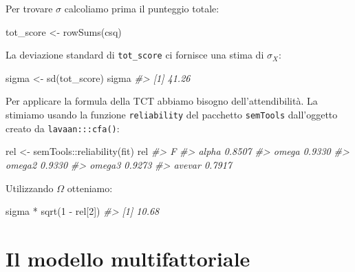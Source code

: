 \documentclass[
  11pt,
]{krantz}
\makeatletter
\newenvironment{Shaded}{\begin{snugshade}}{\end{snugshade}}
\newcommand{\CommentTok}[1]{\textcolor[rgb]{0.37,0.37,0.37}{\textit{#1}}}
\newcommand{\DecValTok}[1]{\textcolor[rgb]{0.06,0.06,0.06}{#1}}
\newcommand{\FunctionTok}[1]{\textcolor[rgb]{0,0,0}{#1}}
\newcommand{\NormalTok}[1]{#1}
\newcommand{\OtherTok}[1]{\textcolor[rgb]{0.37,0.37,0.37}{#1}}
\newcommand{\SpecialCharTok}[1]{\textcolor[rgb]{0,0,0}{#1}}
\newenvironment{kframe}{%
\medskip{}
\setlength{\fboxsep}{.8em}
 \def\at@end@of@kframe{}%
 \ifinner\ifhmode%
  \def\at@end@of@kframe{\end{minipage}}%
  \begin{minipage}{\columnwidth}%
 \fi\fi%
 \def\FrameCommand##1{\hskip\@totalleftmargin \hskip-\fboxsep
 \colorbox{shadecolor}{##1}\hskip-\fboxsep
     \hskip-\linewidth \hskip-\@totalleftmargin \hskip\columnwidth}%
 \MakeFramed {\advance\hsize-\width
   \@totalleftmargin\z@ \linewidth\hsize
   \@setminipage}}%
 {\par\unskip\endMakeFramed%
 \at@end@of@kframe}
\renewenvironment{Shaded}{\begin{kframe}}{\end{kframe}}
\theoremstyle{definition}
\theoremstyle{definition}
\theoremstyle{definition}
\theoremstyle{definition}
\theoremstyle{remark}
\makeatother
\begin{document}
Per trovare \(\sigma\) calcoliamo prima il punteggio totale:

\begin{Shaded}
\begin{Highlighting}[]
\NormalTok{tot\_score }\OtherTok{\textless{}{-}} \FunctionTok{rowSums}\NormalTok{(csq)}
\end{Highlighting}
\end{Shaded}

La deviazione standard di \texttt{tot\_score} ci fornisce una stima di \(\sigma_X\):

\begin{Shaded}
\begin{Highlighting}[]
\NormalTok{sigma }\OtherTok{\textless{}{-}} \FunctionTok{sd}\NormalTok{(tot\_score)}
\NormalTok{sigma}
\CommentTok{\#\textgreater{} [1] 41.26}
\end{Highlighting}
\end{Shaded}

Per applicare la formula della TCT abbiamo bisogno dell'attendibilità. La stimiamo usando la funzione \texttt{reliability} del pacchetto \texttt{semTools} dall'oggetto creato da \texttt{lavaan:::cfa()}:

\begin{Shaded}
\begin{Highlighting}[]
\NormalTok{rel }\OtherTok{\textless{}{-}}\NormalTok{ semTools}\SpecialCharTok{::}\FunctionTok{reliability}\NormalTok{(fit)}
\NormalTok{rel}
\CommentTok{\#\textgreater{}             F}
\CommentTok{\#\textgreater{} alpha  0.8507}
\CommentTok{\#\textgreater{} omega  0.9330}
\CommentTok{\#\textgreater{} omega2 0.9330}
\CommentTok{\#\textgreater{} omega3 0.9273}
\CommentTok{\#\textgreater{} avevar 0.7917}
\end{Highlighting}
\end{Shaded}

Utilizzando \(\Omega\) otteniamo:

\begin{Shaded}
\begin{Highlighting}[]
\NormalTok{sigma }\SpecialCharTok{*} \FunctionTok{sqrt}\NormalTok{(}\DecValTok{1} \SpecialCharTok{{-}}\NormalTok{ rel[}\DecValTok{2}\NormalTok{])}
\CommentTok{\#\textgreater{} [1] 10.68}
\end{Highlighting}
\end{Shaded}

\hypertarget{ch:mod_multifattoriale}{%
\chapter{Il modello multifattoriale}\label{ch:mod_multifattoriale}}
\end{document}

